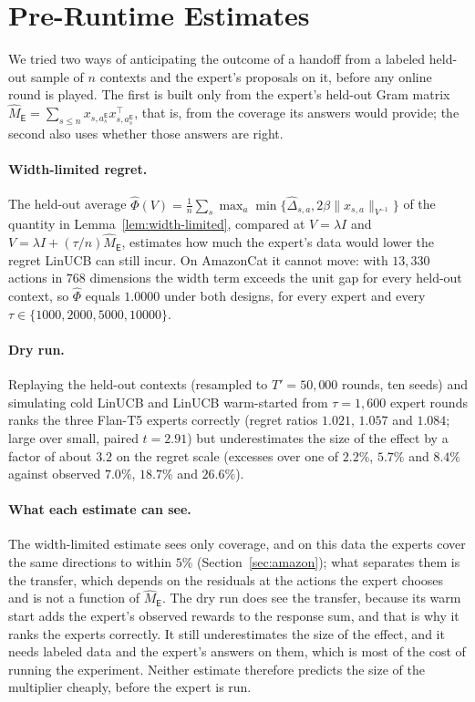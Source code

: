 \documentclass{article}
\theoremstyle{definition}
\theoremstyle{remark}
\theoremstyle{remark}
\newcommand{\Exp}{\mathsf{E}}
\begin{document}
\section{Pre-Runtime Estimates}
\label{app:diagnostics}

We tried two ways of anticipating the outcome of a handoff from a labeled
held-out sample of $n$ contexts and the expert's proposals on it, before any
online round is played. The first is built only from the expert's held-out
Gram matrix
$\widehat M_{\Exp}=\sum_{s\le n}x_{s,a_s^{\Exp}}x_{s,a_s^{\Exp}}^\top$, that is,
from the coverage its answers would provide; the second also uses whether
those answers are right.

\paragraph{Width-limited regret.} The held-out average
$\widehat\Phi(V)=\frac1n\sum_s\max_a\min\{\widehat\Delta_{s,a},2\beta\|x_{s,a}\|_{V^{-1}}\}$
of the quantity in Lemma~\ref{lem:width-limited}, compared at
$V=\lambda I$ and $V=\lambda I+(\tau/n)\widehat M_{\Exp}$, estimates how much
the expert's data would lower the regret LinUCB can still incur. On AmazonCat
it cannot move: with $13{,}330$ actions in $768$ dimensions the width term
exceeds the unit gap for every held-out context, so $\widehat\Phi$ equals
$1.0000$ under both designs, for every expert and every
$\tau\in\{1000,2000,5000,10000\}$.

\paragraph{Dry run.} Replaying the held-out contexts (resampled to
$T'=50{,}000$ rounds, ten seeds) and simulating cold LinUCB and LinUCB
warm-started from $\tau=1{,}600$ expert rounds ranks the three Flan-T5 experts
correctly (regret ratios $1.021$, $1.057$ and $1.084$; large over small,
paired $t=2.91$) but underestimates the size of the effect by a factor of
about $3.2$ on the regret scale (excesses over one of $2.2\%$, $5.7\%$ and
$8.4\%$ against observed $7.0\%$, $18.7\%$ and $26.6\%$).

\paragraph{What each estimate can see.} The width-limited estimate sees only
coverage, and on this data the experts cover the same directions to within
$5\%$ (Section~\ref{sec:amazon}); what separates them is the transfer, which
depends on the residuals at the actions the expert chooses and is not a
function of $\widehat M_{\Exp}$. The dry run does see the transfer, because
its warm start adds the expert's observed rewards to the response sum, and
that is why it ranks the experts correctly. It still underestimates the size
of the effect, and it needs labeled data and the expert's answers on them,
which is most of the cost of running the experiment. Neither estimate
therefore predicts the size of the multiplier cheaply, before the expert is
run.
\end{document}
